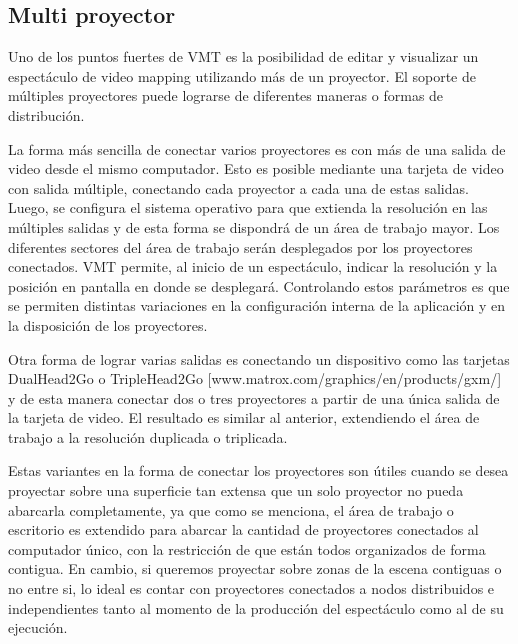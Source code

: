 \subsection{Multi proyector}

Uno de los puntos fuertes de VMT es la posibilidad de editar y visualizar un espectáculo de video mapping utilizando más de un proyector. El soporte de múltiples proyectores puede lograrse de diferentes maneras o formas de distribución.

La forma más sencilla de conectar varios proyectores es con más de una salida de video desde el mismo computador. Esto es posible mediante una tarjeta de video con salida múltiple, conectando cada proyector a cada una de estas salidas. Luego, se configura el sistema operativo para que extienda la resolución en las múltiples salidas y de esta forma se dispondrá de un área de trabajo mayor. Los diferentes sectores del área de trabajo serán desplegados por los proyectores conectados.
VMT permite, al inicio de un espectáculo, indicar la resolución y la posición en pantalla en donde se desplegará. Controlando estos parámetros es que se permiten distintas variaciones en la configuración interna de la aplicación y en la disposición de los proyectores.

Otra forma de lograr varias salidas es conectando un dispositivo como las tarjetas DualHead2Go o TripleHead2Go [www.matrox.com/graphics/en/products/gxm/] y de esta manera conectar dos o tres proyectores a partir de una única salida de la tarjeta de video. El resultado es similar al anterior, extendiendo el área de trabajo a la resolución duplicada o triplicada.

Estas variantes en la forma de conectar los proyectores son útiles cuando se desea proyectar sobre una superficie tan extensa que un solo proyector no pueda abarcarla completamente, ya que como se menciona, el área de trabajo o escritorio es extendido para abarcar la cantidad de proyectores conectados al computador único, con la restricción de que están todos organizados de forma contigua. En cambio, si queremos proyectar sobre zonas de la escena contiguas o no entre si, lo ideal es contar con proyectores conectados a nodos distribuidos e independientes tanto al momento de la producción del espectáculo como al de su ejecución.

